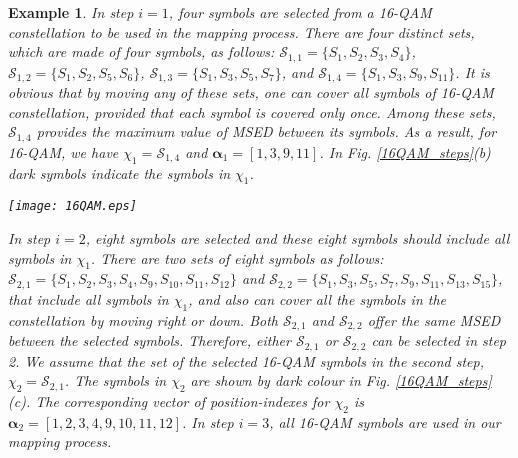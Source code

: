 \documentclass[12pt, draftclsnofoot, onecolumn]{IEEEtran}
\newcommand{\mb}[1]{\boldsymbol{#1}}
\newtheorem{example}{Example}
\begin{document}
  \begin{example}
In step $i = 1$,  four symbols are selected from a 16-QAM constellation to be used  in the mapping process. 
There are four distinct sets, which are made of four symbols,  as follows:    $\mathcal{S}_{1,1}=\lbrace S_{1}, S_{2},S_{3},S_{4} \rbrace$, $\mathcal{S}_{1,2}=\lbrace S_{1}, S_{2},S_{5},S_{6} \rbrace$, $\mathcal{S}_{1,3}=\lbrace S_{1}, S_{3},S_{5},S_{7} \rbrace$, and $\mathcal{S}_{1,4}=\lbrace S_{1}, S_{3}, S_{9}, S_{11} \rbrace$. It is obvious that by moving  any of these sets, one can cover all symbols of 16-QAM constellation, provided that each symbol is covered only once. 
Among these sets, $\mathcal{S}_{1,4}$ provides the maximum value of MSED between its symbols. As a result, for 16-QAM, we have ${\chi}_1=\mathcal{S}_{1,4}$ and $\mb{\alpha}_{1} = [1, 3, 9, 11]$. In Fig. \ref{16QAM_steps}(b) dark symbols indicate the symbols in $\mathcal{\chi}_{1}$. 

\begin{figure*}
\centering
\texttt{[image: 16QAM.eps]} 
\caption{(a)  A 16-QAM constellation, (b) Four selected  16-QAM symbols (dark symbols) to be used in  our mapping in  step $i=1$, and  (c) Eight selected 16-QAM symbols  (dark symbols) to be used in our mapping  in step $i=2$.}
\label{16QAM_steps}
\end{figure*}
  
In step $i= 2$, eight   symbols are selected and  these eight symbols should   include all symbols in $\chi_{1}$. There are two sets of eight symbols as follows:  $\mathcal{S}_{2,1}=\lbrace S_{1}, S_{2},S_{3},S_{4},S_{9}, S_{10},S_{11},S_{12} \rbrace$ and $\mathcal{S}_{2,2}=\lbrace S_{1}, S_{3},S_{5},S_{7},S_{9}, S_{11},S_{13},S_{15} \rbrace$,  that include all symbols in $\chi_{1}$, and also can cover all the symbols in the constellation by moving right or down. Both $\mathcal{S}_{2,1}$ and $\mathcal{S}_{2,2}$ offer the same  MSED between the selected symbols. Therefore, either $\mathcal{S}_{2,1}$ or $\mathcal{S}_{2,2}$  can be selected in step 2.  We assume that the set of the selected 16-QAM symbols in the second step,  ${\chi}_{2}= \mathcal{S}_{2,1}$. The symbols in ${\chi}_2$  are shown by dark colour  in Fig. \ref{16QAM_steps}(c). 
The corresponding vector of position-indexes for $\chi_2$  is $\mb{\alpha}_{2} = [1, 2, 3, 4, 9, 10, 11, 12]$. In step $i=3$, all 16-QAM symbols are used  in our  mapping process. 
\end{example} \color{black}
\end{document}
